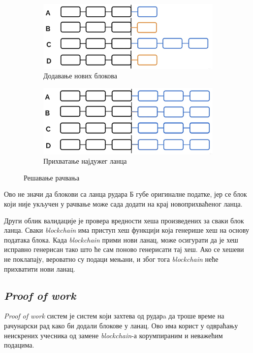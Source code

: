 \documentclass[12pt, a4paper]{article}
\begin{document}
\begin{figure}[h]
    \begin{subfigure}{0.45\linewidth}
        \includegraphics[width=\linewidth]{slike/forks-3.png}
        \caption{Додавање нових блокова}
        \label{fig:forks-c}
    \end{subfigure}
    \hfill
    \begin{subfigure}{0.45\linewidth}
        \includegraphics[width=\linewidth]{slike/forks-4.png}
        \caption{Прихватање најдужег ланца}
        \label{fig:forks-d}
    \end{subfigure}
    \caption{Решавање рачвања}
    \label{fig:combined}
\end{figure}

Ово не значи да блокови са ланца рудара Б губе оригиналне податке, јер се блок који није укључен у рачвање може сада додати на крај новоприхваћеног ланца.

Други облик валидације је провера вредности хеша произведених за сваки блок ланца. Сваки \textit{blockchain} има приступ хеш функцији која генерише хеш на основу података блока. Када \textit{blockchain} прими нови ланац, може осигурати да је хеш исправно генерисан тако што ће сам поново генерисати тај хеш. Ако се хешеви не поклапају, вероватно су подаци мењани, и због тога \textit{blockchain} неће прихватити нови ланац.


\subsection{\textit{Proof of work}}
\textit{Proof of work} систем је систем који захтева од рударa да троше време на рачунарски рад како би додали блокове у ланац. Ово има корист у одвраћању неискрених учесника од замене \textit{blockchain}-а корумпираним и неважећим подацима.
\end{document}
